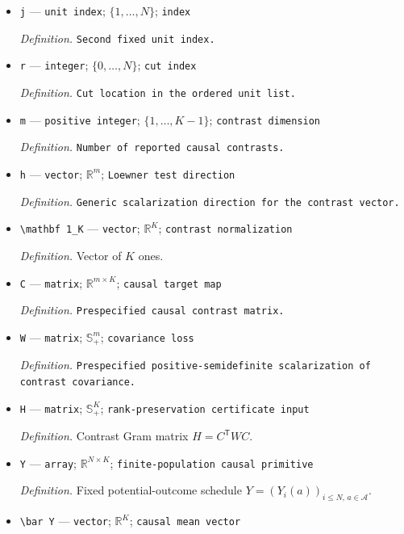 \documentclass{article}
\begin{document}
\begin{itemize}
  \item \texttt{j} --- \texttt{unit index}; \(\{1,\ldots,N\}\); \texttt{index}
  \par\smallskip\noindent\emph{Definition.} \texttt{Second fixed unit index.}
  \item \texttt{r} --- \texttt{integer}; \(\{0,\ldots,N\}\); \texttt{cut index}
  \par\smallskip\noindent\emph{Definition.} \texttt{Cut location in the ordered unit list.}
  \item \texttt{m} --- \texttt{positive integer}; \(\{1,\ldots,K-1\}\); \texttt{contrast dimension}
  \par\smallskip\noindent\emph{Definition.} \texttt{Number of reported causal contrasts.}
  \item \texttt{h} --- \texttt{vector}; \(\mathbb R^m\); \texttt{Loewner test direction}
  \par\smallskip\noindent\emph{Definition.} \texttt{Generic scalarization direction for the contrast vector.}
  \item \texttt{\textbackslash{}\allowbreak{}mathbf 1\_\allowbreak{}K} --- \texttt{vector}; \(\mathbb R^K\); \texttt{contrast normalization}
  \par\smallskip\noindent\emph{Definition.} Vector of \(K\) ones.
  \item \texttt{C} --- \texttt{matrix}; \(\mathbb R^{m\times K}\); \texttt{causal target map}
  \par\smallskip\noindent\emph{Definition.} \texttt{Prespecified causal contrast matrix.}
  \item \texttt{W} --- \texttt{matrix}; \(\mathbb S_+^m\); \texttt{covariance loss}
  \par\smallskip\noindent\emph{Definition.} \texttt{Prespecified positive-\allowbreak{}semidefinite scalarization of contrast covariance.}
  \item \texttt{H} --- \texttt{matrix}; \(\mathbb S_+^K\); \texttt{rank-\allowbreak{}preservation certificate input}
  \par\smallskip\noindent\emph{Definition.} Contrast Gram matrix \(H=C^{\mathsf T}WC\).
  \item \texttt{Y} --- \texttt{array}; \(\mathbb R^{N\times K}\); \texttt{finite-\allowbreak{}population causal primitive}
  \par\smallskip\noindent\emph{Definition.} Fixed potential-outcome schedule \(Y=(Y_i(a))_{i\leq N,\,a\in\mathcal A}\).
  \item \texttt{\textbackslash{}\allowbreak{}bar Y} --- \texttt{vector}; \(\mathbb R^K\); \texttt{causal mean vector}

\end{itemize}
\end{document}
